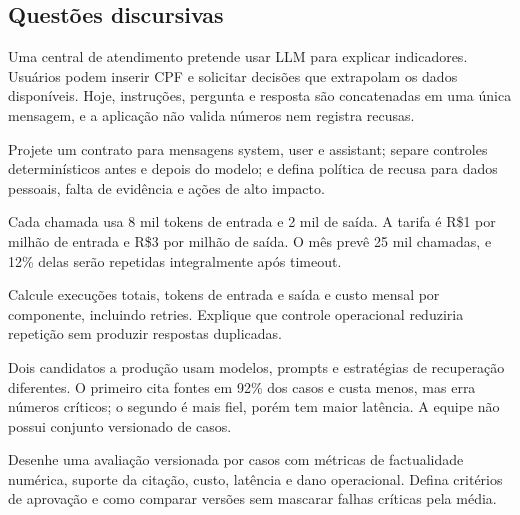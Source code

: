 \subsection{Questões discursivas}


\TextoBase

Uma central de atendimento pretende usar LLM para explicar indicadores. Usuários podem inserir CPF e solicitar decisões que extrapolam os dados disponíveis. Hoje, instruções, pergunta e resposta são concatenadas em uma única mensagem, e a aplicação não valida números nem registra recusas.

\FonteDidatica

\Comando Projete um contrato para mensagens system, user e assistant; separe controles determinísticos antes e depois do modelo; e defina política de recusa para dados pessoais, falta de evidência e ações de alto impacto.


\TextoBase

Cada chamada usa 8 mil tokens de entrada e 2 mil de saída. A tarifa é R\$1 por milhão de entrada e R\$3 por milhão de saída. O mês prevê 25 mil chamadas, e 12\% delas serão repetidas integralmente após timeout.

\FonteDidatica

\Comando Calcule execuções totais, tokens de entrada e saída e custo mensal por componente, incluindo retries. Explique que controle operacional reduziria repetição sem produzir respostas duplicadas.


\TextoBase

Dois candidatos a produção usam modelos, prompts e estratégias de recuperação diferentes. O primeiro cita fontes em 92\% dos casos e custa menos, mas erra números críticos; o segundo é mais fiel, porém tem maior latência. A equipe não possui conjunto versionado de casos.

\FonteDidatica

\Comando Desenhe uma avaliação versionada por casos com métricas de factualidade numérica, suporte da citação, custo, latência e dano operacional. Defina critérios de aprovação e como comparar versões sem mascarar falhas críticas pela média.

